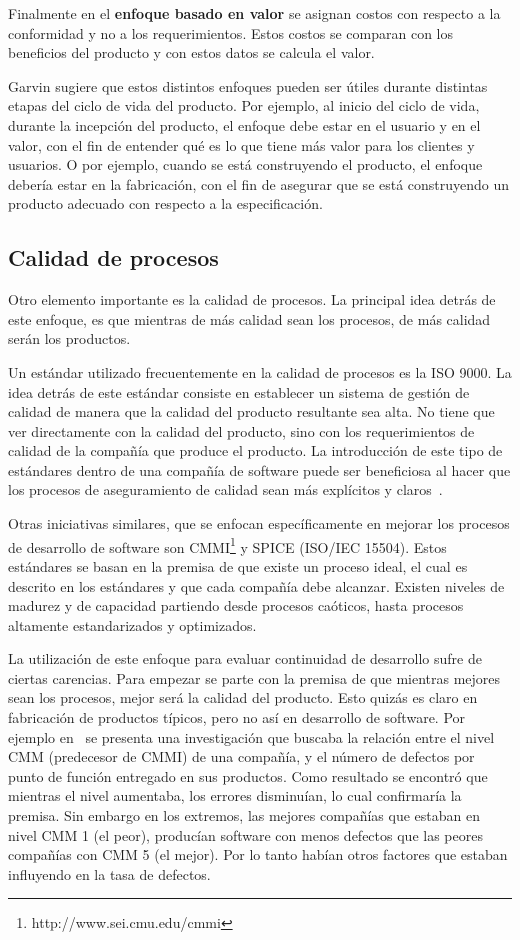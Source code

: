 Finalmente en el \textbf{enfoque basado en valor} se asignan costos con respecto a la conformidad y no
a los requerimientos. Estos costos se comparan con los beneficios del
producto y con estos datos se calcula el valor.

Garvin sugiere que estos distintos enfoques pueden ser útiles durante distintas
etapas del ciclo de vida del producto. Por ejemplo, al inicio del ciclo de 
vida, durante la incepción del producto, el enfoque debe estar en el usuario
y en el valor, con el fin de entender qué es lo que tiene más valor para
los clientes y usuarios. O por ejemplo, cuando se está construyendo el producto,
el enfoque debería estar en la fabricación, con el fin de asegurar que se está
construyendo un producto adecuado con respecto a la especificación.

\subsection{Calidad de procesos}
Otro elemento importante es la calidad de procesos. La principal idea detrás de este enfoque, es que mientras de más
calidad sean los procesos, de más calidad serán los productos.

Un estándar utilizado frecuentemente en la calidad de procesos es la ISO 9000. 
La idea detrás de este estándar consiste en establecer un sistema de gestión de calidad de
manera que la calidad del producto resultante sea alta. No tiene que ver
directamente con la calidad del producto, sino con los requerimientos de calidad
de la compañía que produce el producto.
La introducción de este tipo de estándares dentro de una compañía de software
puede ser beneficiosa al hacer que los procesos de aseguramiento de calidad sean
más explícitos y claros~\cite{Wagner:2013}.

Otras iniciativas similares, que se enfocan específicamente en mejorar los
procesos de desarrollo de software son CMMI\footnote{http://www.sei.cmu.edu/cmmi} y SPICE (ISO/IEC 15504).
Estos estándares se basan en la premisa de que existe un proceso ideal,
el cual es descrito en los estándares y que cada compañía debe alcanzar.
Existen niveles de madurez y de capacidad partiendo desde procesos caóticos,
hasta procesos altamente estandarizados y optimizados.

La utilización de este enfoque para evaluar continuidad de desarrollo sufre
de ciertas carencias. Para empezar se parte con la premisa de que mientras
mejores sean los procesos, mejor será la calidad del producto. Esto quizás
es claro en fabricación de productos típicos, pero no así en desarrollo de
software. Por ejemplo en~\cite{Jones:2000:SAB:335582} se presenta una 
investigación que buscaba la relación entre el nivel CMM (predecesor de CMMI) 
de una compañía, y el número de defectos por punto de función entregado en sus productos.
Como resultado se encontró que mientras el nivel aumentaba, los errores disminuían,
lo cual confirmaría la premisa. Sin embargo en los extremos, las mejores
compañías que estaban en nivel CMM 1 (el peor), producían software con menos
defectos que las peores compañías con CMM 5 (el mejor). Por lo tanto
habían otros factores que estaban influyendo en la tasa de defectos.

